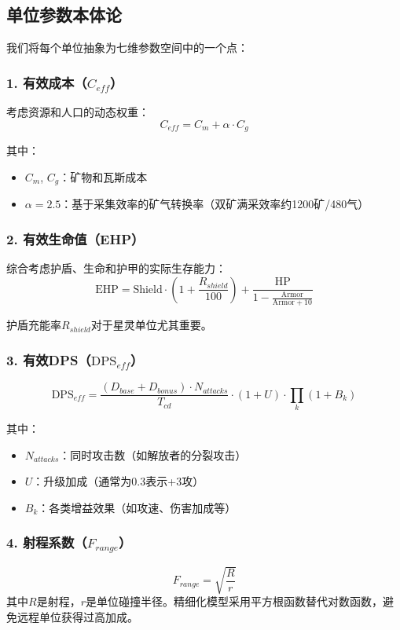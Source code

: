 \documentclass[a4paper,12pt]{article}
\begin{document}
\subsection{单位参数本体论}
我们将每个单位抽象为七维参数空间中的一个点：

\subsubsection{1. 有效成本（$C_{eff}$）}
考虑资源和人口的动态权重：
\begin{equation}
C_{eff} = C_m + \alpha \cdot C_g
\end{equation}

其中：
\begin{itemize}
\item $C_m$, $C_g$：矿物和瓦斯成本
\item $\alpha = 2.5$：基于采集效率的矿气转换率（双矿满采效率约1200矿/480气）
\end{itemize}

\subsubsection{2. 有效生命值（EHP）}
综合考虑护盾、生命和护甲的实际生存能力：
\begin{equation}
\text{EHP} = \text{Shield} \cdot (1 + \frac{R_{shield}}{100}) + \frac{\text{HP}}{1 - \frac{\text{Armor}}{\text{Armor} + 10}}
\end{equation}

护盾充能率$R_{shield}$对于星灵单位尤其重要。

\subsubsection{3. 有效DPS（$\text{DPS}_{eff}$）}
\begin{equation}
\text{DPS}_{eff} = \frac{(D_{base} + D_{bonus}) \cdot N_{attacks}}{T_{cd}} \cdot (1 + U) \cdot \prod_k(1 + B_k)
\end{equation}

其中：
\begin{itemize}
\item $N_{attacks}$：同时攻击数（如解放者的分裂攻击）
\item $U$：升级加成（通常为0.3表示+3攻）
\item $B_k$：各类增益效果（如攻速、伤害加成等）
\end{itemize}

\subsubsection{4. 射程系数（$F_{range}$）}
\begin{equation}
F_{range} = \sqrt{\frac{R}{r}}
\end{equation}
其中$R$是射程，$r$是单位碰撞半径。精细化模型采用平方根函数替代对数函数，避免远程单位获得过高加成。
\end{document}
